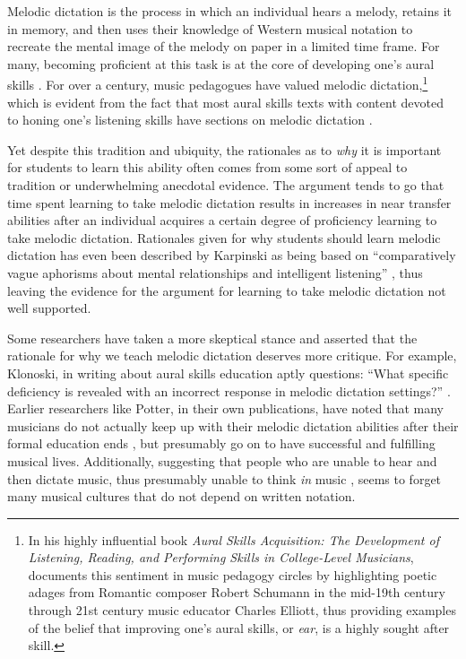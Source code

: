 \documentclass[12pt,]{book}
\let\rmarkdownfootnote\footnote%
\def\footnote{\protect\rmarkdownfootnote}
\begin{document}
Melodic dictation is the process in which an individual hears a melody, retains it in memory, and then uses their knowledge of Western musical notation to recreate the mental image of the melody on paper in a limited time frame.
For many, becoming proficient at this task is at the core of developing one's aural skills \citep{karpinskiModelMusicPerception1990}.
For over a century, music pedagogues have valued melodic dictation,\footnote{In his highly influential book \emph{Aural Skills Acquisition: The Development of Listening, Reading, and Performing Skills in College-Level Musicians}, \citet{karpinskiAuralSkillsAcquisition2000} documents this sentiment in music pedagogy circles by highlighting poetic adages from Romantic composer Robert Schumann in the mid-19th century through 21st century music educator Charles Elliott, thus providing examples of the belief that improving one's aural skills, or \emph{ear}, is a highly sought after skill.} which is evident from the fact that most aural skills texts with content devoted to honing one's listening skills have sections on melodic dictation \citep{karpinskiAuralSkillsAcquisition2000}.

Yet despite this tradition and ubiquity, the rationales as to \emph{why} it is important for students to learn this ability often comes from some sort of appeal to tradition or underwhelming anecdotal evidence.
The argument tends to go that time spent learning to take melodic dictation results in increases in near transfer abilities after an individual acquires a certain degree of proficiency learning to take melodic dictation.
Rationales given for why students should learn melodic dictation has even been described by Karpinski as being based on ``comparatively vague aphorisms about mental relationships and intelligent listening'' \citep[p.~192]{karpinskiModelMusicPerception1990}, thus leaving the evidence for the argument for learning to take melodic dictation not well supported.

Some researchers have taken a more skeptical stance and asserted that the rationale for why we teach melodic dictation deserves more critique.
For example, Klonoski, in writing about aural skills education aptly questions: ``What specific deficiency is revealed with an incorrect response in melodic dictation settings?'' \citep{klonoskiImprovingDictationAuralSkills2006}.
Earlier researchers like Potter, in their own publications, have noted that many musicians do not actually keep up with their melodic dictation abilities after their formal education ends \citep{potterIdentifyingSucessfulDictation1990}, but presumably go on to have successful and fulfilling musical lives.
Additionally, suggesting that people who are unable to hear and then dictate music, thus presumably unable to think \emph{in} music \citep{karpinskiAuralSkillsAcquisition2000}, seems to forget many musical cultures that do not depend on written notation.
\end{document}
